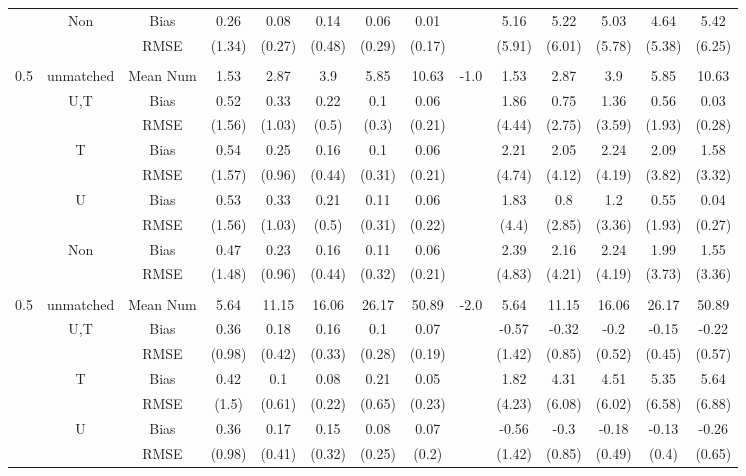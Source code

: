 \begin{tabular}{@{\extracolsep{5pt}}lc|cccccc|lccccc}
 & Non & Bias & 0.26 & 0.08 & 0.14 & 0.06 & 0.01 &  & 5.16 & 5.22 & 5.03 & 4.64 & 5.42 \\
 &  & RMSE & (1.34) & (0.27) & (0.48) & (0.29) & (0.17) &  & (5.91) & (6.01) & (5.78) & (5.38) & (6.25) \\
 &  &  &  &  &  &  &  &  &  &  &  &  &  \\
0.5 & unmatched & Mean Num & 1.53 & 2.87 & 3.9 & 5.85 & 10.63 & -1.0 & 1.53 & 2.87 & 3.9 & 5.85 & 10.63 \\
 & U,T & Bias & 0.52 & 0.33 & 0.22 & 0.1 & 0.06 &  & 1.86 & 0.75 & 1.36 & 0.56 & 0.03 \\
 &  & RMSE & (1.56) & (1.03) & (0.5) & (0.3) & (0.21) &  & (4.44) & (2.75) & (3.59) & (1.93) & (0.28) \\
 & T & Bias & 0.54 & 0.25 & 0.16 & 0.1 & 0.06 &  & 2.21 & 2.05 & 2.24 & 2.09 & 1.58 \\
 &  & RMSE & (1.57) & (0.96) & (0.44) & (0.31) & (0.21) &  & (4.74) & (4.12) & (4.19) & (3.82) & (3.32) \\
 & U & Bias & 0.53 & 0.33 & 0.21 & 0.11 & 0.06 &  & 1.83 & 0.8 & 1.2 & 0.55 & 0.04 \\
 &  & RMSE & (1.56) & (1.03) & (0.5) & (0.31) & (0.22) &  & (4.4) & (2.85) & (3.36) & (1.93) & (0.27) \\
 & Non & Bias & 0.47 & 0.23 & 0.16 & 0.11 & 0.06 &  & 2.39 & 2.16 & 2.24 & 1.99 & 1.55 \\
 &  & RMSE & (1.48) & (0.96) & (0.44) & (0.32) & (0.21) &  & (4.83) & (4.21) & (4.19) & (3.73) & (3.36) \\
 &  &  &  &  &  &  &  &  &  &  &  &  &  \\
0.5 & unmatched & Mean Num & 5.64 & 11.15 & 16.06 & 26.17 & 50.89 & -2.0 & 5.64 & 11.15 & 16.06 & 26.17 & 50.89 \\
 & U,T & Bias & 0.36 & 0.18 & 0.16 & 0.1 & 0.07 &  & -0.57 & -0.32 & -0.2 & -0.15 & -0.22 \\
 &  & RMSE & (0.98) & (0.42) & (0.33) & (0.28) & (0.19) &  & (1.42) & (0.85) & (0.52) & (0.45) & (0.57) \\
 & T & Bias & 0.42 & 0.1 & 0.08 & 0.21 & 0.05 &  & 1.82 & 4.31 & 4.51 & 5.35 & 5.64 \\
 &  & RMSE & (1.5) & (0.61) & (0.22) & (0.65) & (0.23) &  & (4.23) & (6.08) & (6.02) & (6.58) & (6.88) \\
 & U & Bias & 0.36 & 0.17 & 0.15 & 0.08 & 0.07 &  & -0.56 & -0.3 & -0.18 & -0.13 & -0.26 \\
 &  & RMSE & (0.98) & (0.41) & (0.32) & (0.25) & (0.2) &  & (1.42) & (0.85) & (0.49) & (0.4) & (0.65) \\

\end{tabular}
